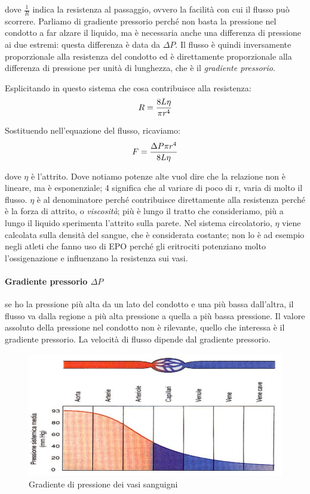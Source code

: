 \documentclass[a4paper,12pt]{article}
\begin{document}
dove $\frac{1}{R}$ indica la resistenza al passaggio, ovvero la facilità con cui il flusso può scorrere. Parliamo di gradiente pressorio perché non basta la pressione nel condotto a far alzare il liquido, ma è necessaria anche una differenza di pressione ai due estremi: questa differenza è data da $\Delta P$. Il flusso è quindi inversamente proporzionale alla resistenza del condotto ed è direttamente proporzionale alla differenza di pressione per unità di lunghezza, che è il \emph{gradiente pressorio}.

Esplicitando in questo sistema che cosa contribuisce alla resistenza:
\begin{equation}
\centering
R=\frac{8 L \eta}{\pi r^{4}}
\end{equation}

Sostituendo nell'equazione del flusso, ricaviamo:
\begin{equation}
\centering
F=\frac{\Delta P \pi r^{4}}{8 L \eta }
\end{equation}

dove $\eta$ è l'attrito. Dove notiamo potenze alte vuol dire che la relazione non è lineare, ma è esponenziale; 4 significa che al variare di poco di r, varia di molto il flusso. $\eta$ è al denominatore perché contribuisce direttamente alla resistenza perché è la forza di attrito, o \emph{viscosità}; più è lungo il tratto che consideriamo, più a lungo il liquido sperimenta l'attrito sulla parete. Nel sistema circolatorio, $\eta$ viene calcolata sulla densità del sangue, che è considerata costante; non lo è ad esempio negli atleti che fanno uso di EPO perché gli eritrociti potenziano molto l'ossigenazione e influenzano la resistenza sui vasi. 

\paragraph{Gradiente pressorio $\Delta P$} se ho la pressione più alta da un lato del condotto e una più bassa dall'altra, il flusso va dalla regione a più alta pressione a quella a più bassa pressione. Il valore assoluto della pressione nel condotto non è rilevante, quello che interessa è il gradiente pressorio. La velocità di flusso dipende dal gradiente pressorio.

\begin{figure}[H]
\centering
\includegraphics[scale=0.4]{immagine/pressione1.jpg}
\caption{Gradiente di pressione dei vasi sanguigni}
\end{figure}
\end{document}

